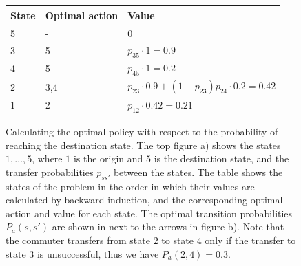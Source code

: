 \documentclass[dissertation,draft*]{aaltoseries}
\begin{document}
\begin{figure}
\\
\ \ \ \ \ \ \ \ \ \ \ \
\\
{\footnotesize
\begin{tabular}{|p{1cm}|p{1.0cm}|p{5.5cm}|}
\hline
State & Optimal action & Value \\
\hline
5 & - & 0 \\
3 & 5 & $p_{35} \cdot 1 = 0.9$ \\
4 & 5 & $p_{45} \cdot 1 = 0.2$ \\
2 & 3,4 & $p_{23} \cdot 0.9 + (1-p_{23}) p_{24} \cdot 0.2 = 0.42$\\
1 & 2 & $p_{12} \cdot 0.42 =0.21$ \\
\hline
\end{tabular}
}
\caption{Calculating the optimal policy with respect to the probability of reaching the destination state. 
The top figure a) shows the states $1,\ldots,5$, where $1$ is the origin and $5$ is the destination state, and the 
transfer probabilities $p_{ss'}$ between the states. 
The table shows the states of the problem in the order in which their values are
calculated by backward induction, and the corresponding optimal action and value for each state.
The optimal transition probabilities $P_a(s,s')$ are shown in next to the arrows in figure b). 
Note that the commuter transfers from state $2$ to state $4$ only if the transfer to state $3$ is unsuccessful, thus we have
$P_a(2,4) = 0.3$. 
}
\label{toyexample}
\end{figure}
\end{document}
